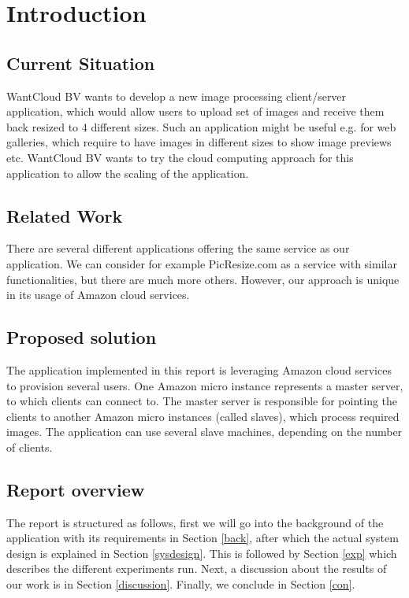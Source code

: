 \section{Introduction}
\subsection{Current Situation} 
WantCloud BV wants to develop a new image processing client/server application, which would allow users to upload set of images and receive them back resized to 4 different sizes. Such an application might be useful e.g. for web galleries, which require to have images in different sizes to show image previews etc. WantCloud BV wants to try the cloud computing approach for this application to allow the scaling of the application.

\subsection{Related Work} 
There are several different applications offering the same service as our application. We can consider for example PicResize.com\cite{picresize} as a service with similar functionalities, but there are much more others. However, our approach is unique in its usage of Amazon cloud services. 

\subsection{Proposed solution}
The application implemented in this report is leveraging Amazon cloud services to provision several users. One Amazon micro instance represents a master server, to which clients can connect to. The master server is responsible for pointing the clients to another Amazon micro instances (called slaves), which process required images. The application can use several slave machines, depending on the number of clients.

\subsection{Report overview}
The report is structured as follows, first we will go into the background of the application with its requirements in Section \ref{back}, after which the actual system design is explained in Section \ref{sysdesign}. This is followed by Section \ref{exp} which describes the different experiments run. Next, a discussion about the results of our work is in Section \ref{discussion}. Finally, we conclude in Section \ref{con}.